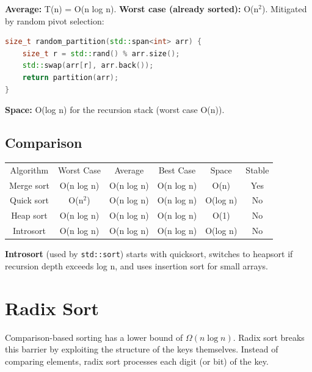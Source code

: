 \textbf{Average:} T(n) = O(n log n). \textbf{Worst case (already sorted):} O(n$^{2}$).  
Mitigated by random pivot selection:

\begin{lstlisting}[language=C++]
size_t random_partition(std::span<int> arr) {
    size_t r = std::rand() % arr.size();
    std::swap(arr[r], arr.back());
    return partition(arr);
}
\end{lstlisting}

\textbf{Space:} O(log n) for the recursion stack (worst case O(n)).

\subsection{Comparison}

\begin{center}
\begin{tabular}{cccccc}
\toprule
Algorithm & Worst Case & Average & Best Case & Space & Stable \\
Merge sort & O(n log n) & O(n log n) & O(n log n) & O(n) & Yes \\
Quick sort & O(n$^{2}$) & O(n log n) & O(n log n) & O(log n) & No \\
Heap sort & O(n log n) & O(n log n) & O(n log n) & O(1) & No \\
Introsort & O(n log n) & O(n log n) & O(n log n) & O(log n) & No \\

\bottomrule
\end{tabular}
\end{center}
\textbf{Introsort} (used by \texttt{std::sort}) starts with quicksort, switches to heapsort if recursion depth exceeds log n, and uses insertion sort for small arrays.


\section{Radix Sort}
\label{sec:radix-sort}

Comparison-based sorting has a lower bound of $\Omega(n \log n)$. Radix sort breaks this barrier by exploiting the structure of the keys themselves. Instead of comparing elements, radix sort processes each digit (or bit) of the key.

